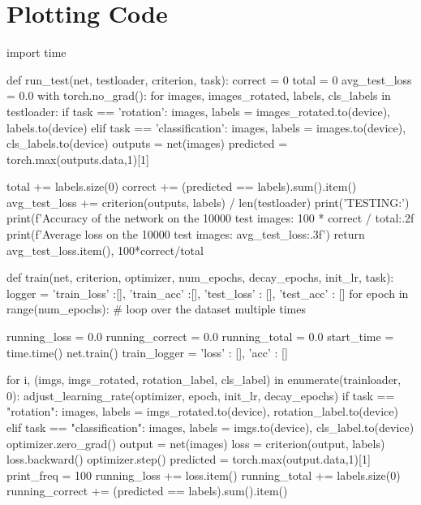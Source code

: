 \documentclass[10pt]{article}
\begin{document}
\section{Plotting Code}
\begin{python}
import time

def run_test(net, testloader, criterion, task):
    correct = 0
    total = 0
    avg_test_loss = 0.0
    with torch.no_grad():
        for images, images_rotated, labels, cls_labels in testloader:
            if task == 'rotation':
              images, labels = images_rotated.to(device), labels.to(device)
            elif task == 'classification':
              images, labels = images.to(device), cls_labels.to(device)
            outputs = net(images)
            predicted = torch.max(outputs.data,1)[1]

            total += labels.size(0)
            correct += (predicted == labels).sum().item()
            avg_test_loss += criterion(outputs, labels)  / len(testloader)
    print('TESTING:')
    print(f'Accuracy of the network on the 10000 test images: {100 * correct / total:.2f} %
    print(f'Average loss on the 10000 test images: {avg_test_loss:.3f}')
    return avg_test_loss.item(), 100*correct/total

def train(net, criterion, optimizer, num_epochs, decay_epochs, init_lr, task):
    logger = {
        'train_loss' :[],
        'train_acc' :[],
        'test_loss' : [],
        'test_acc' : []
    }
    for epoch in range(num_epochs):  # loop over the dataset multiple times

        running_loss = 0.0
        running_correct = 0.0
        running_total = 0.0
        start_time = time.time()
        net.train()
        train_logger = {'loss' : [], 'acc' : []}

        for i, (imgs, imgs_rotated, rotation_label, cls_label) in enumerate(trainloader, 0):
            adjust_learning_rate(optimizer, epoch, init_lr, decay_epochs)
            if task == "rotation":
              images, labels = imgs_rotated.to(device), rotation_label.to(device)
            elif task == "classification":
              images, labels = imgs.to(device), cls_label.to(device)
            optimizer.zero_grad()
            output = net(images)
            loss = criterion(output, labels)
            loss.backward()
            optimizer.step()
            predicted = torch.max(output.data,1)[1]
            print_freq = 100
            running_loss += loss.item()
            running_total += labels.size(0)
            running_correct += (predicted == labels).sum().item()


\end{python}
\end{document}
